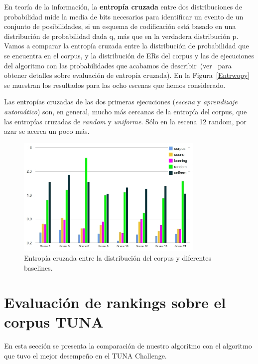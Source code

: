En teor\'ia de la informaci\'on, la \textbf{entrop\'ia cruzada} entre dos distribuciones de probabilidad mide la media de bits necesarios para identificar un evento de un conjunto de posibilidades, si un esquema de codificaci\'on est\'a basado en una distribuci\'on de probabilidad dada q, m\'as que en la verdadera distribuci\'on p. Vamos a comparar la entrop\'ia cruzada entre la distribuci\'on de probabilidad que se encuentra en el corpus, y la distribuci\'on de ERs del corpus y las de ejecuciones del algoritmo con las probabilidades que acabamos de describir~(ver~\cite{juraksky:spee08} para obtener detalles sobre evaluaci\'on de entrop\'{i}a cruzada). En la Figura~\ref{Entrwopy} se muestran los resultados para las ocho escenas que hemos considerado.

Las entrop\'{i}as cruzadas de las dos primeras ejecuciones (\emph{escena} y \emph{aprendizaje autom\'atico}) son, en general, mucho m\'as cercanas de la entrop\'{i}a del corpus, que las entrop\'ias cruzadas de \emph{random} y \emph{uniforme}. S\'olo en la escena 12 random, por azar se acerca un poco m\'as.

\begin{figure}[h]
\centering
\includegraphics[width=0.8\textwidth]{images/entropy.jpg}
\caption{Entrop\'ia cruzada entre la distribuci\'on del corpus y diferentes baselines.}\label{Entropy}
\end{figure}
  
\bigskip
  

\section{Evaluaci\'on de rankings sobre el corpus TUNA} \label{sec:automaticevaluation}

En esta secci\'on se presenta la comparaci\'on de nuestro algoritmo con el algoritmo que tuvo el mejor desempe\~no en el TUNA Challenge. 

